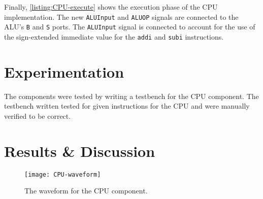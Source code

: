 \documentclass[11pt]{report}
\begin{document}

Finally, \ref{listing:CPU-execute} shows the execution phase of the CPU implementation. The new
\verb|ALUInput| and \verb|ALUOP| signals are connected to the ALU's \verb|B| and \verb|S| ports. The
\verb|ALUInput| signal is connected to account for the use of the sign-extended immediate value for
the \verb|addi| and \verb|subi| instructions.

\section*{Experimentation}
The components were tested by writing a testbench for the CPU component. The testbench written
tested for given instructions for the CPU and were manually verified to be correct.

\newpage

\section*{Results \& Discussion}
\begin{figure}[h!]
    \centering
    \texttt{[image: CPU-waveform]}
    \caption{The waveform for the CPU component.}
    \label{fig:CPU-waveform}
\end{figure}
\end{document}
